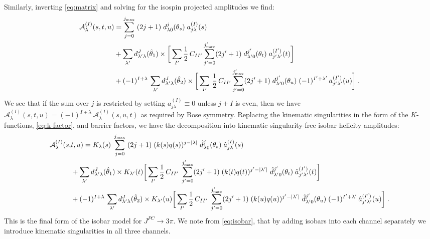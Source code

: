 Similarly, inverting \cref{eq:matrix} and solving for the isospin projected amplitudes we find:
  \begin{align}
    \mathcal{A}^{(I)}_\lambda(s,t,u) &=
    \sum_{j = 0}^{j_\text{max}} \; (2j + 1) \; d_{\lambda 0}^j(\theta_s) \; a_{j \lambda}^{(I)}(s) \nonumber \\
    &+ \sum_{\lambda^\prime} d_{{\lambda^\prime} \lambda}^J(\hat{\theta}_1) \times
    \bigg[
    \sum_{I^\prime} \frac{1}{2} \, C_{I{I^\prime}}
    \sum_{{j^\prime} = 0}^{j^\prime_\text{max}} (2{j^\prime} + 1) \; d_{{\lambda^\prime} 0}^{j^\prime}(\theta_t) \; a_{{j^\prime} {\lambda^\prime}}^{({I^\prime})}(t)
    \bigg] \\
    &+ (-1)^{I + \lambda} \, \sum_{\lambda^\prime}  d_{{\lambda^\prime} \lambda}^J(\hat{\theta}_2) \times
    \bigg[
     \sum_{I^\prime} \, \frac{1}{2} \, C_{I{I^\prime}}
    \sum_{{j^\prime} = 0}^{j^\prime_\text{max}} (2{j^\prime} + 1) \;d_{{\lambda^\prime} 0}^{j^\prime}(\theta_u) \;  (-1)^{{I^\prime} + {\lambda^\prime}} \,  a_{{j^\prime} {\lambda^\prime}}^{({I^\prime})}(u)
    \bigg] \nonumber \; .
  \end{align}
We see that if the sum over \(j\) is restricted by setting \(a_{j\lambda}^{(I)} \equiv 0 \) unless \(j + I\) is even, then we have \(\mathcal{A}_\lambda^{(I)}(s,t,u) = (-1)^{I + \lambda} \, \mathcal{A}_\lambda^{(I)}(s,u,t)\) as required by Bose symmetry. Replacing the kinematic singularities in the form of the \(K\)-functions, \cref{eq:k-factor}, and barrier factors, we have the decomposition into kinematic-singularity-free isobar helicity amplitudes:
\begin{align}
  \label{eq:isobar}
    \mathcal{A}^{(I)}_\lambda(s,&t,u) =
    K_\lambda(s) \; \sum_{j = 0}^{j_\text{max}} \; (2j + 1) \; (k(s)q(s))^{j-|\lambda|} \; \hat{d}_{\lambda 0}^j(\theta_s) \; \hat{a}_{j \lambda}^{(I)}(s) \nonumber \\
    &+ \sum_{\lambda^\prime}  d_{{\lambda^\prime} \lambda}^J(\hat{\theta}_1) \times
    K_{\lambda^\prime}(t)
    \bigg[
    \sum_{I^\prime} \frac{1}{2} \, C_{I{I^\prime}} \;
    \sum_{{j^\prime} = 0}^{j^\prime_\text{max}} (2{j^\prime} + 1) \; (k(t)q(t))^{{j^\prime}-|{\lambda^\prime}|} \; \hat{d}_{{\lambda^\prime} 0}^{j^\prime}(\theta_t) \; \hat{a}_{{j^\prime}{\lambda^\prime}}^{({I^\prime})}(t)
    \bigg] \\
    &+ (-1)^{I + \lambda} \, \sum_{\lambda^\prime}  d_{{\lambda^\prime} \lambda}^J(\hat{\theta}_2) \times
    K_{\lambda^\prime}(u)
    \bigg[
    \sum_{I^\prime}  \frac{1}{2} \, C_{I{I^\prime}} \;
    \sum_{{j^\prime} = 0}^{j^\prime_\text{max}} (2{j^\prime} + 1) \;  (k(u)q(u))^{{j^\prime}-|{\lambda^\prime}|} \; \hat{d}_{{\lambda^\prime} 0}^{j^\prime}(\theta_u)
    \;  (-1)^{{I^\prime} + {\lambda^\prime}} \,\hat{a}_{{j^\prime}{\lambda^\prime}}^{({I^\prime})}(u)
    \bigg] \nonumber \; .
  \end{align}
This is the final form of the isobar model for \(J^{PC} \to 3\pi\). We note from \cref{eq:isobar}, that by adding isobars into each channel separately we introduce kinematic singularities in all three channels.
